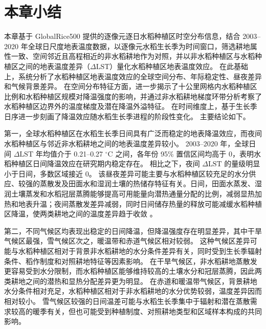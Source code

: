 
\section{本章小结}
本章基于 GlobalRice500 提供的逐像元逐日水稻种植区时空分布信息，结合 2003--2020 年全球日尺度地表温度数据，以逐像元水稻生长季为时间窗口，筛选耕地属性一致、空间邻近且高程相近的非水稻耕地作为对照，并以非水稻种植区与水稻种植区之间的地表温度差异（\(\Delta\mathrm{LST}\)）量化水稻种植区地表温度效应。
在此基础上，系统分析了水稻种植区地表温度效应的全球空间分布、年际稳定性、昼夜差异和气候背景差异。
在空间分布特征方面，进一步揭示了十公里网格内水稻种植区比例和水稻种植区规模对降温强度的影响，并通过非水稻耕地梯度环带分析考察了水稻种植区边界外的温度梯度及潜在降温外溢特征。
在时间维度上，基于生长季日序进一步刻画了降温效应随水稻生长季进程的阶段性变化。
主要结论如下。

第一，全球水稻种植区在水稻生长季日间具有广泛而稳定的地表降温效应，而夜间水稻种植区与邻近非水稻耕地之间的地表温度差异较小。
2003--2020 年，全球日间 $\Delta \mathrm{LST}$ 年均值介于 0.21--0.27 $^{\circ}\mathrm{C}$ 之间，各年份 95\% 置信区间均高于 0，表明水稻种植区日间降温效应在研究期内稳定存在。
相比之下，夜间 $\Delta \mathrm{LST}$ 的量级明显小于日间，多数区域接近 0。
该昼夜差异可能主要与水稻种植区较充足的水分供应、较强的蒸散发及田面水和湿润土壤的热储存特征有关。日间，田面水蒸发、湿润土壤蒸发和水稻冠层蒸腾能够提高可用能量向潜热通量分配的比例，减弱显热加热和地表升温；夜间蒸散发差异减弱，同时日间储存热量的释放可能减缓水稻种植区降温，使两类耕地之间的温度差异趋于收敛 \cite{Bonan2008Science,Seneviratne2010SoilMoisture,McDermid2023Irrigation,Schultz2017Diurnal}。

第二，不同气候区均表现出稳定的日间降温，但降温强度存在明显差异，其中干旱气候区最强，雪气候区次之，暖温带和赤道气候区相对较弱。
这种气候区差异可能与水稻种植区相对于背景非水稻耕地的水分条件差异有关，同时受到生长季辐射条件、稻作制度和对照耕地特征等因素影响。
在干旱气候区，非水稻耕地蒸散发更容易受到水分限制，而水稻种植区能够维持较高的土壤水分和冠层蒸腾，因此两类耕地之间的潜热和显热分配差异更为明显。
在赤道和暖温带气候区，背景耕地水分条件相对充足，水稻种植区相对于非水稻耕地的水分优势较弱，温度差异因而相对较小。
雪气候区较强的日间温差可能与水稻生长季集中于辐射和潜在蒸散需求较高的暖季有关，但也可能受到种植制度、对照耕地类型和区域样本构成的共同影响。

